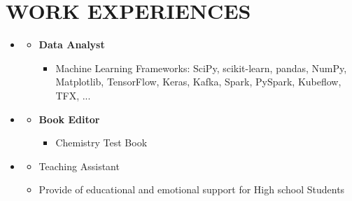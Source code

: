 \documentclass[10pt,a4paper,sans]{moderncv} %
\begin{document}
	\vspace{ 1.3 em}
	
	\vspace{-2.3em}
	\section{WORK EXPERIENCES}
	
	
	\begin{itemize}
		\item \href{https://www.foumanchimie.com/}{}
		
		\begin{itemize}
			\item \textbf{Data Analyst} 
			    \begin{itemize}
			        \item Machine Learning Frameworks: SciPy, scikit-learn, pandas, NumPy, Matplotlib, TensorFlow, Keras, Kafka, Spark, PySpark, Kubeflow, TFX, ... 
			        
				\end{itemize}
		\end{itemize}
	\end{itemize}
	

	\begin{itemize}
		\item \href{https://kheilisabz.com/}{}
		
		\begin{itemize}
			\item \textbf{Book Editor} 
			    \begin{itemize}
			        \item Chemistry Test Book 
			        
				\end{itemize}
		\end{itemize}
	\end{itemize}
	
	
	\vspace{0.71 em}
	
		\begin{itemize}
		
		\item \href{https://www.kanoon.ir/}{}
		
		
		\begin{itemize}
			
			\item Teaching Assistant
				\item Provide of educational and emotional support for High school Students

		\end{itemize}
	\end{itemize}
	
\end{document}
